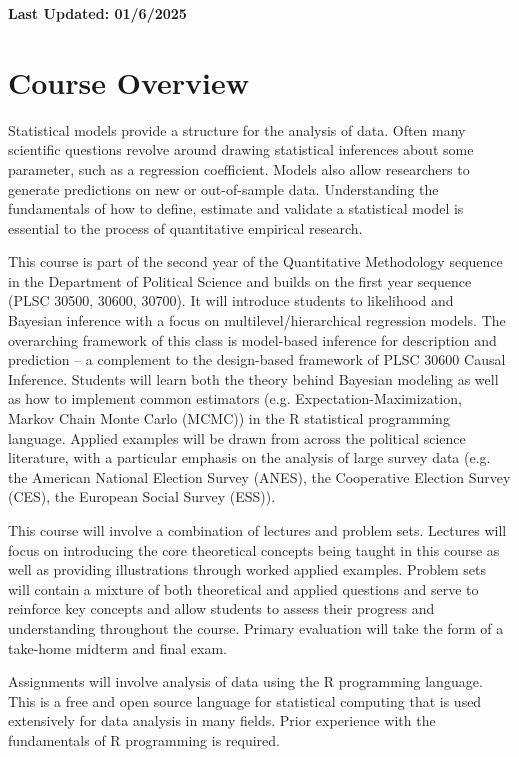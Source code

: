 \documentclass[11pt, article, oneside]{memoir}
\title{{\mytitle}}
\author{\myauthor\smallskip\footnotesize\newline Office: Pick Hall 328, 3rd floor
  \newline Office Hours: Tuesdays 4pm-6pm or schedule an appointment by e-mail \newline
    \myemail \newline \mywebsite
\newline
}
\date{}
\theoremstyle{Assumption}
\begin{document}
\maketitle
\textbf{Last Updated: 01/6/2025}
\section*{Course Overview}

Statistical models provide a structure for the analysis of data. Often many scientific questions revolve around drawing statistical inferences about some parameter, such as a regression coefficient. Models also allow researchers to generate predictions on new or out-of-sample data. Understanding the fundamentals of how to define, estimate and validate a statistical model is essential to the process of quantitative empirical research.

This course is part of the second year of the Quantitative Methodology sequence in the Department of Political Science and builds on the first year sequence (PLSC 30500, 30600, 30700). It will introduce students to likelihood and Bayesian inference with a focus on multilevel/hierarchical regression models. The overarching framework of this class is model-based inference for description and prediction -- a complement to the design-based framework of PLSC 30600 Causal Inference. Students will learn both the theory behind Bayesian modeling as well as how to implement common estimators (e.g. Expectation-Maximization, Markov Chain Monte Carlo (MCMC)) in the R statistical programming language. Applied examples will be drawn from across the political science literature, with a particular emphasis on the analysis of large survey data (e.g. the American National Election Survey (ANES), the Cooperative Election Survey (CES), the European Social Survey (ESS)).

This course will involve a combination of lectures and problem sets. Lectures will focus on introducing the core theoretical concepts being taught in this course as well as providing illustrations through worked applied examples. Problem sets will contain a mixture of both theoretical and applied questions and serve to reinforce key concepts and allow students to assess their progress and understanding throughout the course. Primary evaluation will take the form of a take-home midterm and final exam.

Assignments will involve analysis of data using the R programming language. This is a free and open source language for statistical computing that is used extensively for data analysis in many fields. Prior experience with the fundamentals of R programming is required.
\end{document}
